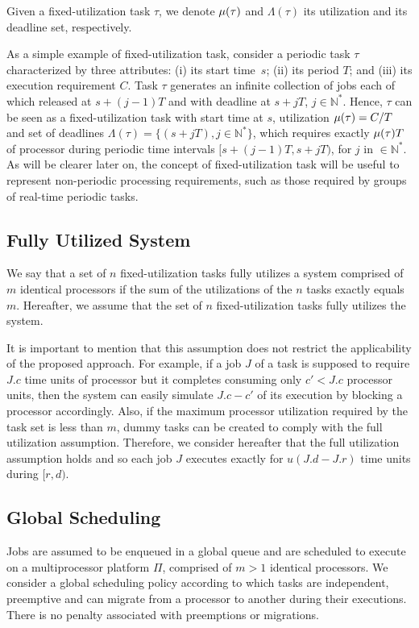 \documentclass[twocolumn, compsocconf]{IEEEtran}
\newcommand{\Nat}{\ensuremath{\mathbb{N}}\xspace}
\newcommand{\procSet}{\ensuremath{\Pi}\xspace}
\newcounter{proc}
\begin{document}
Given a fixed-utilization task $\tau$, we denote $\mu(\tau)$ and
$\Lambda(\tau)$ its utilization and its deadline set, respectively.


As a simple example of fixed-utilization task, consider a periodic task $\tau$
characterized by three attributes: (i) its start time $\,s$; (ii) its period
$T$; and (iii) its execution requirement $C$. Task $\tau$ generates an infinite
collection of jobs each of which released at $s + (j-1) T$ and with deadline at
$s + j T$, $j \in \Nat^*$. Hence, $\tau$ can be seen as a fixed-utilization task
with start time at $s$, utilization $\mu(\tau) = C/T$ and set of deadlines
$\Lambda(\tau) = \{ (s + j T), j \in \Nat^* \}$, which requires exactly
$\mu(\tau) T$ of processor during periodic time intervals $[s + (j-1) T, s + j
T)$, for $j$ in $\in \Nat^*$.  As will be clearer later on, the concept of
fixed-utilization task will be useful to represent non-periodic processing
requirements, such as those required by groups of real-time periodic tasks.


\subsection{Fully Utilized System}
\label{sec:fullyUtilSyst}

We say that a set of $n$ fixed-utilization tasks fully utilizes a system
comprised of $m$ identical processors if the sum of the utilizations of the $n$
tasks exactly equals $m$. Hereafter, we assume that the set of $n$
fixed-utilization tasks fully utilizes the system.

It is important to mention that this assumption does not restrict the
applicability of the proposed approach.  For example, if a job $J$ of a task is
supposed to require $J.c$ time units of processor but it completes consuming
only $c'< J.c$ processor units, then the system can easily simulate $J.c - c'$
of its execution by blocking a processor accordingly. Also, if the maximum
processor utilization required by the task set is less than $m$, dummy tasks can
be created to comply with the full utilization assumption. Therefore, we
consider hereafter that the full utilization assumption holds and so each job
$J$ executes exactly for $u(J.d-J.r)$ time units during $[r,d)$.


\subsection{Global Scheduling} 

Jobs are assumed to be enqueued in a global queue and are scheduled to execute
on a multiprocessor platform $\procSet$, comprised of $m > 1$ identical
processors. We consider a global scheduling policy according to which tasks are
independent, preemptive and can migrate from a processor to another during their
executions. There is no penalty associated with preemptions or migrations.
\end{document}
